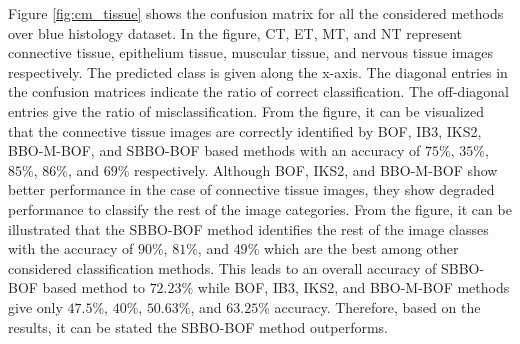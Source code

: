 Figure \ref{fig:cm_tissue} shows the confusion matrix for all the considered methods over blue histology dataset. In the figure, CT, ET, MT, and NT represent connective tissue, epithelium tissue, muscular tissue, and nervous tissue images respectively. The predicted class is given along the x-axis. The diagonal entries in the confusion matrices indicate the ratio of correct classification. The off-diagonal entries give the ratio of misclassification. From the figure, it can be visualized that the connective tissue images are correctly identified by BOF, IB3, IKS2, BBO-M-BOF, and SBBO-BOF based methods with an accuracy of $75\%$, $35\%$, $85\%$, $86\%$, and $69\%$ respectively. Although BOF, IKS2, and BBO-M-BOF  show better performance in the case of connective tissue images, they show degraded performance to classify the rest of the image categories. From the figure, it can be illustrated that the SBBO-BOF method identifies the rest of the image classes with the accuracy of $90\%$, $81\%$, and $49\%$ which are the best among other considered classification methods. This leads to an overall accuracy of SBBO-BOF based method to $72.23\%$ while BOF, IB3, IKS2, and BBO-M-BOF methods give only $47.5\%$, $40\%$, $50.63\%$, and $63.25\%$ accuracy. Therefore, based on the results, it can be stated the SBBO-BOF method outperforms. 

